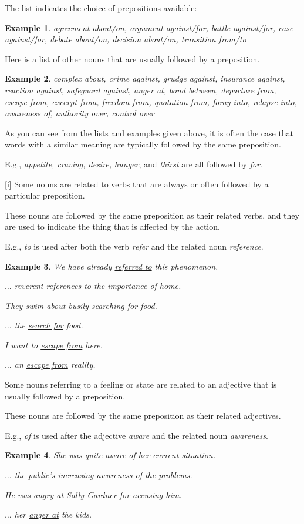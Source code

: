 \documentclass[oneside]{book}
\numberwithin{equation}{section}
\newtheorem{example}{Example}[section]
\begin{document}
The list indicates the choice of prepositions available:
\begin{example}
    agreement about/on, argument against/for, battle against/for, case against/for, debate about/on, decision about/on, transition from/to
\end{example}
Here is a list of other nouns that are usually followed by a preposition.
\begin{example}
    complex about, crime against, grudge against, insurance against, reaction against, safeguard against, anger at, bond between, departure from, escape from, excerpt from, freedom from, quotation from, foray into, relapse into, awareness of, authority over, control over
\end{example}
As you can see from the lists and examples given above, it is often the case that words with a similar meaning are typically followed by the same preposition.

E.g., \textit{appetite, craving, desire, hunger}, and \textit{thirst} are all followed by \textit{for}.

%
\noindent{} [i] Some nouns are related to verbs that are always or often followed by a particular preposition.

These nouns are followed by the same preposition as their related verbs, and they are used to indicate the thing that is affected by the action.

E.g., \textit{to} is used after both the verb \textit{refer} and the related noun \textit{reference}.
\begin{example}
    We have already \underline{referred to} this phenomenon.
    
    $\ldots$ reverent \underline{references to} the importance of home.
    
    They swim about busily \underline{searching for} food.
    
    $\ldots$ the \underline{search for} food.
    
    I want to \underline{escape from} here.
    
    $\ldots$ an \underline{escape from} reality.
\end{example}
%
\noindent{} Some nouns referring to a feeling or state are related to an adjective that is usually followed by a preposition.

These nouns are followed by the same preposition as their related adjectives.

E.g., \textit{of} is used after the adjective \textit{aware} and the related noun \textit{awareness}.
\begin{example}
    She was quite \underline{aware of} her current situation.
    
    $\ldots$ the public's increasing \underline{awareness of} the problems.
    
    He was \underline{angry at} Sally Gardner for accusing him.
    
    $\ldots$ her \underline{anger at} the kids.
\end{example}
\end{document}
